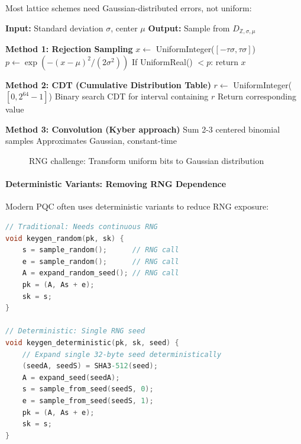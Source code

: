 \documentclass[11pt,a4paper]{article}
\begin{document}
Most lattice schemes need Gaussian-distributed errors, not uniform:

\begin{algorithm}
\caption{Discrete Gaussian Sampling}
\label{alg:gaussian-sample}
\begin{algorithmic}[1]
\State \textbf{Input:} Standard deviation $\sigma$, center $\mu$
\State \textbf{Output:} Sample from $D_{\mathbb{Z},\sigma,\mu}$

\State \textbf{Method 1: Rejection Sampling}
    \State $x \gets$ UniformInteger($[-\tau\sigma, \tau\sigma]$)
    \State $p \gets \exp(-(x-\mu)^2/(2\sigma^2))$
    \State If UniformReal() $< p$: return $x$
\EndWhile

\State \textbf{Method 2: CDT (Cumulative Distribution Table)}
\State $r \gets$ UniformInteger($[0, 2^{64}-1]$)
\State Binary search CDT for interval containing $r$
\State Return corresponding value

\State \textbf{Method 3: Convolution (Kyber approach)}
\State Sum 2-3 centered binomial samples
\State Approximates Gaussian, constant-time
\end{algorithmic}
\end{algorithm}

\begin{figure}[h]
\centering
{}
\caption{RNG challenge: Transform uniform bits to Gaussian distribution}
\end{figure}

\paragraph{Deterministic Variants: Removing RNG Dependence}

Modern PQC often uses deterministic variants to reduce RNG exposure:

\begin{lstlisting}[language=C, caption=Deterministic Key Generation]
// Traditional: Needs continuous RNG
void keygen_random(pk, sk) {
    s = sample_random();      // RNG call
    e = sample_random();      // RNG call
    A = expand_random_seed(); // RNG call
    pk = (A, As + e);
    sk = s;
}

// Deterministic: Single RNG seed
void keygen_deterministic(pk, sk, seed) {
    // Expand single 32-byte seed deterministically
    (seedA, seedS) = SHA3-512(seed);
    A = expand_seed(seedA);
    s = sample_from_seed(seedS, 0);
    e = sample_from_seed(seedS, 1);
    pk = (A, As + e);
    sk = s;
}
\end{lstlisting}
\end{document}
